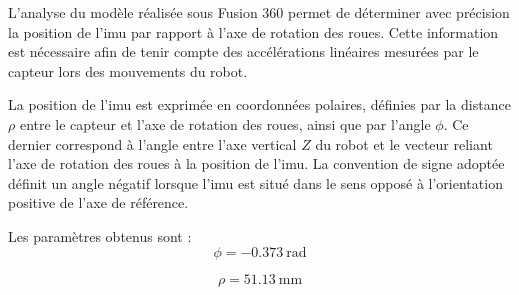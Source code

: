 L'analyse du modèle réalisée sous Fusion 360 permet de déterminer avec précision la position de l'\acrshort{imu} par rapport à l'axe de rotation des roues. Cette information est nécessaire afin de tenir compte des accélérations linéaires mesurées par le capteur lors des mouvements du robot.

La position de l'\acrshort{imu} est exprimée en coordonnées polaires, définies par la distance $\rho$ entre le capteur et l'axe de rotation des roues, ainsi que par l'angle $\phi$. Ce dernier correspond à l'angle entre l'axe vertical $Z$ du robot et le vecteur reliant l'axe de rotation des roues à la position de l'\acrshort{imu}. La convention de signe adoptée définit un angle négatif lorsque l'\acrshort{imu} est situé dans le sens opposé à l'orientation positive de l'axe de référence.

Les paramètres obtenus sont :
$$
\phi = -0.373~\mathrm{rad}
$$

$$
\rho = 51.13~\mathrm{mm}
$$

